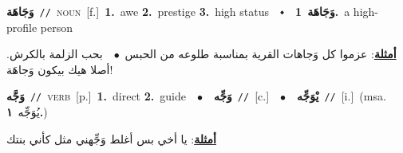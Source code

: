 \documentclass[10pt,a4paper,twoside]{article} %
\begin{document}
\begin{multicols}{2}
{\setlength\topsep{0pt}\textbf{\foreignlanguage{arabic}{وَجَاهَة}}\ {\color{gray}\texttt{//}\color{black}}\ \textsc{noun}\ [f.]\ \textbf{1.}~awe  \textbf{2.}~prestige  \textbf{3.}~high status\ \ $\smblkdiamond$\ \ \setlength\topsep{0pt}\textbf{\foreignlanguage{arabic}{وَجَاهَة}}\ \textbf{1.}~a high-profile person\  \begin{flushright}\color{gray}\foreignlanguage{arabic}{\textbf{\underline{\foreignlanguage{arabic}{أمثلة}}}: عزموا كل وَجاهات القرية بمناسبة طلوعه من الحبس\ $\bullet$\ \  بحب الزلمة بالكرش. أصلا هيك بيكون وَجاهَة!}\end{flushright}\color{black}} \vspace{2mm}

{\setlength\topsep{0pt}\textbf{\foreignlanguage{arabic}{وَجَّه}}\ {\color{gray}\texttt{//}\color{black}}\ \textsc{verb}\ [p.]\ \textbf{1.}~direct  \textbf{2.}~guide\ \ $\bullet$\ \ \setlength\topsep{0pt}\textbf{\foreignlanguage{arabic}{وَجِّه}}\ {\color{gray}\texttt{//}\color{black}}\ [c.]\ \ $\bullet$\ \ \setlength\topsep{0pt}\textbf{\foreignlanguage{arabic}{يْوَجِّه}}\ {\color{gray}\texttt{//}\color{black}}\ [i.]\ \color{gray}(msa. \foreignlanguage{arabic}{يُوَجِّه}~\foreignlanguage{arabic}{\textbf{١.}})\color{black}\  \begin{flushright}\color{gray}\foreignlanguage{arabic}{\textbf{\underline{\foreignlanguage{arabic}{أمثلة}}}: يا أخي بس أغلط وَجِّهني مثل كأني بنتك}\end{flushright}\color{black}} \vspace{2mm}


\end{multicols}
\end{document}
